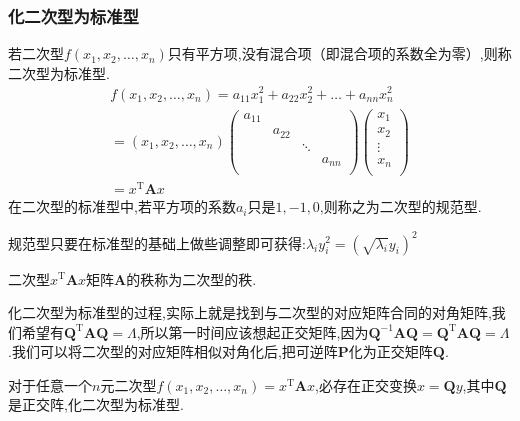 \subsubsection{化二次型为标准型}
\begin{definition}
    若二次型$f(x_1,x_2,\dots,x_n)$只有平方项,没有混合项（即混合项的系数全为零）,则称二次型为标准型.
    \begin{gather*}
        f(x_1,x_2,\dots,x_n)=a_{11}x_1^2+a_{22}x_2^2+\dots+a_{nn}x_n^2\\
        =(x_1,x_2,\dots,x_n)
        \begin{pmatrix}
            a_{11}   &      &      &      \\
               &   a_{22}   &      &      \\
               &      &   \ddots   &      \\
               &      &      &   a_{nn}   \\
        \end{pmatrix}
        \begin{pmatrix}
            x_1  \\
            x_2  \\
            \vdots  \\
            x_n  \\
        \end{pmatrix}\\
        =x^\mathrm{T}\mathbf{A}x
    \end{gather*}
    在二次型的标准型中,若平方项的系数$a_i$只是$1,-1,0$,则称之为二次型的规范型.
\end{definition}
规范型只要在标准型的基础上做些调整即可获得:$\lambda_iy_i^2=(\sqrt{\lambda_i}y_i)^2$

\begin{definition}
    二次型$x^\mathrm{T}\mathbf{A}x$矩阵$\mathbf{A}$的秩称为二次型的秩.
\end{definition}

化二次型为标准型的过程,实际上就是找到与二次型的对应矩阵合同的对角矩阵,我们希望有$\mathbf{Q}^\mathrm{T}\mathbf{A}\mathbf{Q}=\varLambda $,所以第一时间应该想起正交矩阵,因为$\mathbf{Q}^{-1}\mathbf{A}\mathbf{Q}=\mathbf{Q}^\mathrm{T}\mathbf{A}\mathbf{Q}=\varLambda $.我们可以将二次型的对应矩阵相似对角化后,把可逆阵$\mathbf{P}$化为正交矩阵$\mathbf{Q}$.

\begin{ttheorem}
    对于任意一个$n$元二次型$f(x_1,x_2,\dots,x_n)=x^\mathrm{T}\mathbf{A}x$,必存在正交变换$x=\mathbf{Q}y$,其中$\mathbf{Q}$是正交阵,化二次型为标准型.
\end{ttheorem}

